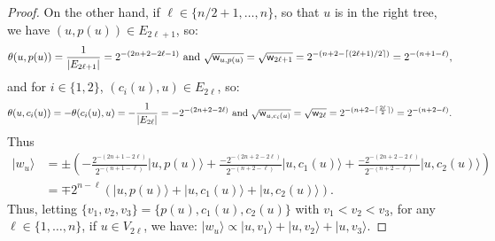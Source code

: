 \documentclass{theoretics}
\def\ket#1{{\lvert}#1\rangle}
\renewcommand{\>}{\rangle}
\newcommand{\<}{\langle}
\renewcommand{\(}{\left(}
\renewcommand{\)}{\right)}
\def\w{{\sf w}}
\begin{document}
\begin{proof}
\noindent On the other hand, if $\ell\in \{n/2+1,\dots, n\}$, so that $u$ is in the right tree, we have $(u,p(u))\in E_{2\ell+1}$, so:
$$\theta(u,p(u)) = \frac{1}{|E_{2\ell+1}|} = 2^{-(2n+2-2\ell-1)}
\mbox{ and }
\sqrt{\w_{u,p(u)}}=\sqrt{\w_{2\ell+1}}=2^{-(n+2-\lceil (2\ell+1)/2\rceil)} = 2^{-(n+1-\ell)},
$$
and for $i\in\{1,2\}$, $(c_i(u),u)\in E_{2\ell}$, so:
$$\theta(u,c_i(u)) = -\theta(c_i(u),u)=-\frac{1}{|E_{2\ell}|} = -2^{-(2n+2-2\ell)}
\mbox{ and }
\sqrt{\w_{u,c_i(u)}}=\sqrt{\w_{2\ell}}=2^{-(n+2-\lceil \frac{2\ell}{2}\rceil)} = 2^{-(n+2-\ell)}.
$$
Thus
\begin{align*}
\ket{w_u} &= \pm\left(-\frac{2^{-(2n+1-2\ell)}}{2^{-(n+1-\ell)}}\ket{u,p(u)}+\frac{-2^{-(2n+2-2\ell)}}{2^{-(n+2-\ell)}}\ket{u,c_1(u)}+\frac{-2^{-(2n+2-2\ell)}}{2^{-(n+2-\ell)}}\ket{u,c_2(u)}\right)\\
&=\mp 2^{n-\ell}\left(\ket{u,p(u)}+\ket{u,c_1(u)}+\ket{u,c_2(u)}\right).
\end{align*}
Thus, letting $\{v_1,v_2,v_3\}=\{p(u),c_1(u),c_2(u)\}$ with $v_1<v_2<v_3$, for any $\ell\in \{1,\dots,n\}$, if $u\in V_{2\ell}$, we have:
$\ket{w_u}\propto \ket{u,v_1}+\ket{u,v_2}+\ket{u,v_3}.$
\end{proof}
\end{document}
